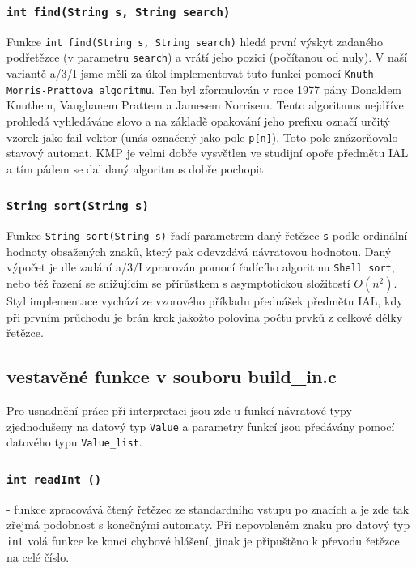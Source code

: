 \documentclass[a4paper,11pt]{article}
\begin{document}
\subsubsection {\texttt{int find(String s, String search)}}
Funkce \texttt{int find(String s, String search)} hledá první výskyt zadaného podřetězce (v parametru \texttt{search}) a vrátí jeho pozici (počítanou od nuly). V naší variantě a/3/I jsme měli za úkol implementovat tuto funkci pomocí \texttt{Knuth-Morris-Prattova algoritmu}. Ten byl zformulován v roce 1977 pány Donaldem Knuthem, Vaughanem Prattem a Jamesem Norrisem. Tento algoritmus nejdříve prohledá vyhledáváne slovo a na základě opakování jeho prefixu označí určitý vzorek jako fail-vektor (unás označený jako pole \texttt{p[n]}). Toto pole znázorňovalo stavový automat. KMP je velmi dobře vysvětlen ve studijní opoře předmětu IAL a tím pádem se dal daný algoritmus dobře pochopit.

\subsubsection {\texttt{String sort(String s)}}
Funkce \texttt{String sort(String s)} řadí parametrem daný řetězec \texttt{s} podle ordinální hodnoty obsažených znaků, který pak odevzdává návratovou hodnotou. Daný výpočet je dle zadání a/3/I zpracován pomocí řadícího algoritmu \texttt{Shell sort}, nebo též řazení se snižujícím se přírůstkem s asymptotickou složitostí $O(n^{2})$. Styl implementace vychází ze vzorového příkladu přednášek předmětu IAL, kdy při prvním průchodu je brán krok jakožto polovina počtu prvků z celkové délky řetězce.

\subsection {vestavěné funkce v souboru build{\_}in.c}
Pro usnadnění práce při interpretaci jsou zde u funkcí návratové typy zjednodušeny na datový typ \texttt{Value} a parametry funkcí jsou předávány pomocí datového typu \texttt{Value\_list}.

\subsubsection {\texttt{int readInt ()}} - funkce zpracovává čtený řetězec ze standardního vstupu po znacích a je zde tak zřejmá podobnost s konečnými automaty. Při nepovoleném znaku pro datový typ \texttt{int} volá funkce ke konci chybové hlášení, jinak je připuštěno k převodu řetězce na celé číslo.
\end{document}
